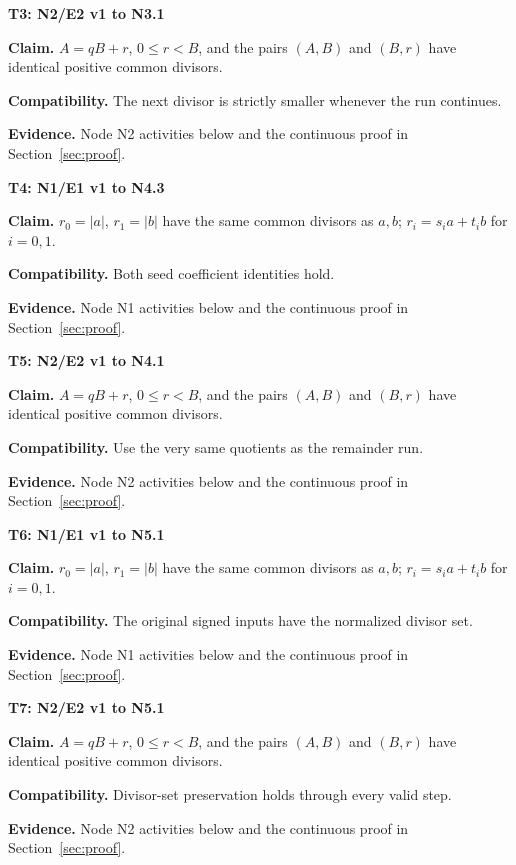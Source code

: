 \documentclass[preprint,12pt,aps,pra,showkeys,amsmath,amssymb,superscriptaddress,floatfix]{revtex4-2}
\theoremstyle{definition}
\theoremstyle{remark}
\newcommand{\field}[2]{\par\smallskip\noindent\textbf{#1.} #2\par}
\begin{document}
\smallskip\noindent\textbf{T3: N2/E2 v1 to N3.1}

\field{Claim}{\(A=qB+r\), \(0\le r<B\), and the pairs \((A,B)\) and \((B,r)\) have
identical positive common divisors.}

\field{Compatibility}{The next divisor is strictly smaller whenever the run continues.}

\field{Evidence}{Node N2 activities below and the continuous proof in Section~\ref{sec:proof}.}

\smallskip\noindent\textbf{T4: N1/E1 v1 to N4.3}

\field{Claim}{\(r_0=|a|\), \(r_1=|b|\) have the same common divisors as \(a,b\);
\(r_i=s_i a+t_i b\) for \(i=0,1\).}

\field{Compatibility}{Both seed coefficient identities hold.}

\field{Evidence}{Node N1 activities below and the continuous proof in Section~\ref{sec:proof}.}

\smallskip\noindent\textbf{T5: N2/E2 v1 to N4.1}

\field{Claim}{\(A=qB+r\), \(0\le r<B\), and the pairs \((A,B)\) and \((B,r)\) have
identical positive common divisors.}

\field{Compatibility}{Use the very same quotients as the remainder run.}

\field{Evidence}{Node N2 activities below and the continuous proof in Section~\ref{sec:proof}.}

\smallskip\noindent\textbf{T6: N1/E1 v1 to N5.1}

\field{Claim}{\(r_0=|a|\), \(r_1=|b|\) have the same common divisors as \(a,b\);
\(r_i=s_i a+t_i b\) for \(i=0,1\).}

\field{Compatibility}{The original signed inputs have the normalized divisor set.}

\field{Evidence}{Node N1 activities below and the continuous proof in Section~\ref{sec:proof}.}

\smallskip\noindent\textbf{T7: N2/E2 v1 to N5.1}

\field{Claim}{\(A=qB+r\), \(0\le r<B\), and the pairs \((A,B)\) and \((B,r)\) have
identical positive common divisors.}

\field{Compatibility}{Divisor-set preservation holds through every valid step.}

\field{Evidence}{Node N2 activities below and the continuous proof in Section~\ref{sec:proof}.}
\end{document}
